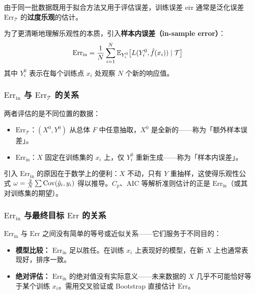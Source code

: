 由于同一批数据既用于拟合方法又用于评估误差，训练误差 $\overline{\mathrm{err}}$ 通常是泛化误差 $\mathrm{Err}_{\mathcal{T}}$ 的\textbf{过度乐观}的估计。

为了更清晰地理解乐观性的本质，引入\textbf{样本内误差（in-sample error）}：
\begin{equation}\label{eq:Err_in}
    \mathrm{Err}_{\text{in}} = \frac{1}{N}\sum_{i=1}^{N} \mathbb{E}_{Y_i^0}\bigl[L(Y_i^0, \hat{f}(x_i)) \mid \mathcal{T}\bigr]
\end{equation}
其中 $Y_i^0$ 表示在每个训练点 $x_i$ 处观察 $N$ 个新的响应值。

\subsubsection{$\mathrm{Err}_{\text{in}}$ 与 $\mathrm{Err}_{\mathcal{T}}$ 的关系}

两者评估的是不同位置的数据：

\begin{itemize}
    \item $\mathrm{Err}_{\mathcal{T}}$：$(X^0, Y^0)$ 从总体 $F$ 中任意抽取，$X^0$ 是全新的——称为「额外样本误差」。
    \item $\mathrm{Err}_{\text{in}}$：$X$ 固定在训练集的 $x_i$ 上，仅 $Y_i^0$ 重新生成——称为「样本内误差」。
\end{itemize}

引入 $\mathrm{Err}_{\text{in}}$ 的原因在于数学上的便利：$X$ 不动，只有 $Y$ 重抽样，这使得乐观性公式 $\omega = \frac{2}{N}\sum \mathrm{Cov}(\hat{y}_i, y_i)$ 得以推导。$C_p$、AIC 等解析准则估计的正是 $\mathrm{Err}_{\text{in}}$（或其对训练集的期望）。

\subsubsection{$\mathrm{Err}_{\text{in}}$ 与最终目标 $\mathrm{Err}$ 的关系}

$\mathrm{Err}_{\text{in}}$ 与 $\mathrm{Err}$ 之间没有简单的等号或近似关系——它们服务于不同目的：

\begin{itemize}
    \item \textbf{模型比较：} $\mathrm{Err}_{\text{in}}$ 足以胜任。在训练 $x_i$ 上表现好的模型，在新 $X$ 上也通常表现好，排序一致。
    \item \textbf{绝对评估：} $\mathrm{Err}_{\text{in}}$ 的绝对值没有实际意义——未来数据的 $X$ 几乎不可能恰好等于某个训练 $x_i$。需用交叉验证或 Bootstrap 直接估计 $\mathrm{Err}$。
\end{itemize}

